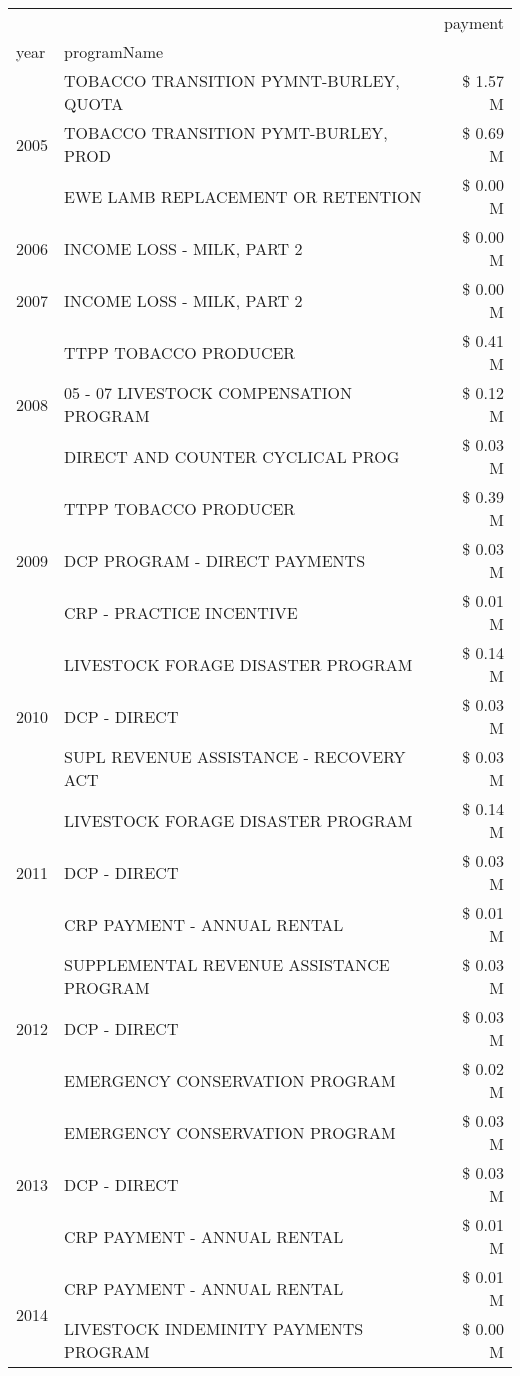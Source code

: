 \begin{tabular}{llr}
\toprule
 &  & payment \\
year & programName &  \\
\midrule
\multirow[t]{3}{*}{2005} & TOBACCO TRANSITION PYMNT-BURLEY, QUOTA & \$ 1.57 M \\
 & TOBACCO TRANSITION PYMT-BURLEY, PROD & \$ 0.69 M \\
 & EWE LAMB REPLACEMENT OR RETENTION & \$ 0.00 M \\
\cline{1-3}
2006 & INCOME LOSS - MILK, PART 2 & \$ 0.00 M \\
\cline{1-3}
2007 & INCOME LOSS - MILK, PART 2 & \$ 0.00 M \\
\cline{1-3}
\multirow[t]{3}{*}{2008} & TTPP TOBACCO PRODUCER & \$ 0.41 M \\
 & 05 - 07 LIVESTOCK COMPENSATION PROGRAM & \$ 0.12 M \\
 & DIRECT AND COUNTER CYCLICAL PROG & \$ 0.03 M \\
\cline{1-3}
\multirow[t]{3}{*}{2009} & TTPP TOBACCO PRODUCER & \$ 0.39 M \\
 & DCP PROGRAM - DIRECT PAYMENTS & \$ 0.03 M \\
 & CRP - PRACTICE INCENTIVE & \$ 0.01 M \\
\cline{1-3}
\multirow[t]{3}{*}{2010} & LIVESTOCK FORAGE DISASTER PROGRAM & \$ 0.14 M \\
 & DCP - DIRECT & \$ 0.03 M \\
 & SUPL REVENUE ASSISTANCE - RECOVERY ACT & \$ 0.03 M \\
\cline{1-3}
\multirow[t]{3}{*}{2011} & LIVESTOCK FORAGE DISASTER PROGRAM & \$ 0.14 M \\
 & DCP - DIRECT & \$ 0.03 M \\
 & CRP PAYMENT - ANNUAL RENTAL & \$ 0.01 M \\
\cline{1-3}
\multirow[t]{3}{*}{2012} & SUPPLEMENTAL REVENUE ASSISTANCE PROGRAM & \$ 0.03 M \\
 & DCP - DIRECT & \$ 0.03 M \\
 & EMERGENCY CONSERVATION PROGRAM & \$ 0.02 M \\
\cline{1-3}
\multirow[t]{3}{*}{2013} & EMERGENCY CONSERVATION PROGRAM & \$ 0.03 M \\
 & DCP - DIRECT & \$ 0.03 M \\
 & CRP PAYMENT - ANNUAL RENTAL & \$ 0.01 M \\
\cline{1-3}
\multirow[t]{3}{*}{2014} & CRP PAYMENT - ANNUAL RENTAL & \$ 0.01 M \\
 & LIVESTOCK INDEMINITY PAYMENTS PROGRAM & \$ 0.00 M \\

\end{tabular}

